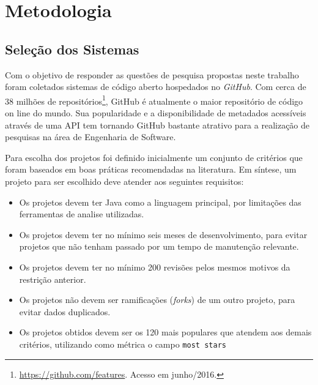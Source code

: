 \documentclass[12pt]{article}
\begin{document}
\section{Metodologia}
\label{sec:metodologia}


\subsection{Seleção dos Sistemas}
\label{subsec:selecao_sistemas}

Com o objetivo de responder as questões de pesquisa propostas neste trabalho foram coletados sistemas de código aberto hospedados no \textsl{GitHub}. Com cerca de 38 milhões de repositórios\footnote{\url{https://github.com/features}. Acesso em junho/2016.}, GitHub é atualmente o maior repositório de código on line do mundo. Sua popularidade e a disponibilidade de metadados acessíveis através de uma API tem tornando GitHub bastante atrativo para a realização de pesquisas na área de Engenharia de Software. 

Para escolha dos projetos foi definido inicialmente um conjunto de critérios que foram baseados em boas práticas recomendadas na literatura\cite{Bird2009}. Em síntese, um projeto para ser escolhido deve atender aos seguintes requisitos:

\begin{itemize}
	\item Os projetos devem ter Java como a linguagem principal, por limitações das
ferramentas de analise utilizadas.
\\
	\item Os projetos devem ter no mínimo seis meses de desenvolvimento, para evitar projetos que não 
tenham passado por um tempo de manutenção relevante.
\\
\item Os  projetos  devem  ter  no  mínimo  200  revisões  pelos  mesmos  motivos  da
restrição anterior.
\\
\item Os projetos não devem ser ramificações (\textsl{forks}) de um outro projeto, para evitar dados duplicados.

\item Os projetos obtidos devem ser os 120 mais populares que atendem aos demais critérios, utilizando como métrica o campo \texttt{most stars}
\end{itemize}
\end{document}
